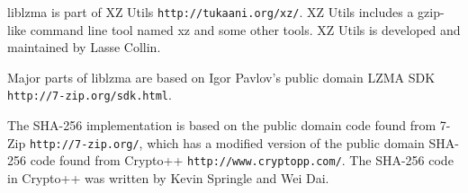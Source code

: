 liblzma is part of X\-Z Utils {\tt http\-://tukaani.\-org/xz/}. X\-Z Utils includes a gzip-\/like command line tool named xz and some other tools. X\-Z Utils is developed and maintained by Lasse Collin.

Major parts of liblzma are based on Igor Pavlov's public domain L\-Z\-M\-A S\-D\-K {\tt http\-://7-\/zip.\-org/sdk.\-html}.

The S\-H\-A-\/256 implementation is based on the public domain code found from 7-\/\-Zip {\tt http\-://7-\/zip.\-org/}, which has a modified version of the public domain S\-H\-A-\/256 code found from Crypto++ {\tt http\-://www.\-cryptopp.\-com/}. The S\-H\-A-\/256 code in Crypto++ was written by Kevin Springle and Wei Dai. 